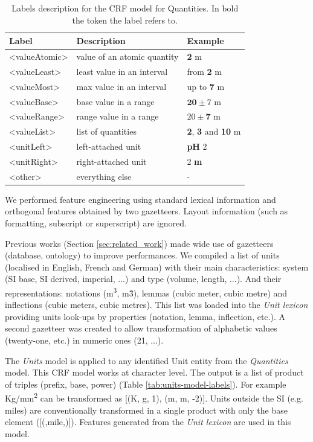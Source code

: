 \documentclass[sigconf]{acmart}
\begin{document}
\begin{table}[ht]
  \caption{Labels description for the CRF model for Quantities. In bold the token the label refers to.}
  \label{tab:quantities-model-labels}
  \begin{tabular}{lll}
    \toprule
    Label & Description & Example\\
    \midrule
    <valueAtomic> & value of an atomic quantity & \textbf{2} m \\
    <valueLeast> & least value in an interval & from \textbf{2} m \\
    <valueMost> & max value in an interval & up to \textbf{7} m \\
    <valueBase> & base value in a range & $\textbf{20}\pm7$ m \\
    <valueRange> & range value in a range & $20 \pm \textbf{7}$ m \\
    <valueList> & list of quantities & \textbf{2}, \textbf{3} and \textbf{10} m \\
    <unitLeft> & left-attached unit & \textbf{pH} 2 \\
    <unitRight> & right-attached unit & 2 \textbf{m} \\
    <other> & everything else & - \\
  \bottomrule
\end{tabular}
\end{table}

We performed feature engineering using standard lexical information and orthogonal features obtained by two gazetteers. Layout information (such as formatting, subscript or superscript) are ignored.

Previous works (Section \ref{sec:related_work}) made wide use of gazetteers (database, ontology) to improve performances. We compiled a list of units (localised in English, French and German) with their main characteristics: system (SI base, SI derived, imperial, ...) and type (volume, length, ...). And their representations: notations (m\textsuperscript{3}, m\^3), lemmas (cubic meter, cubic metre) and inflections (cubic meters, cubic metres).  This list was loaded into the \textit{Unit lexicon} providing units look-ups by properties (notation, lemma, inflection, etc.). A second gazetteer was created to allow transformation of alphabetic values (twenty-one, etc.) in numeric ones (21, ...). 

The \textit{Units} model is applied to any identified Unit entity from the \textit{Quantities} model. This CRF model works at character level. The output is a list of product of triples (prefix, base, power) (Table \ref{tab:units-model-labels}). For example Kg/mm\textsuperscript{2} can be transformed as [(K, g, 1), (m, m, -2)]. Units outside the SI (e.g. miles) are conventionally transformed in a single product with only the base element ([(,mile,)]). Features generated from the \textit{Unit lexicon} are used in this model. 
\end{document}
